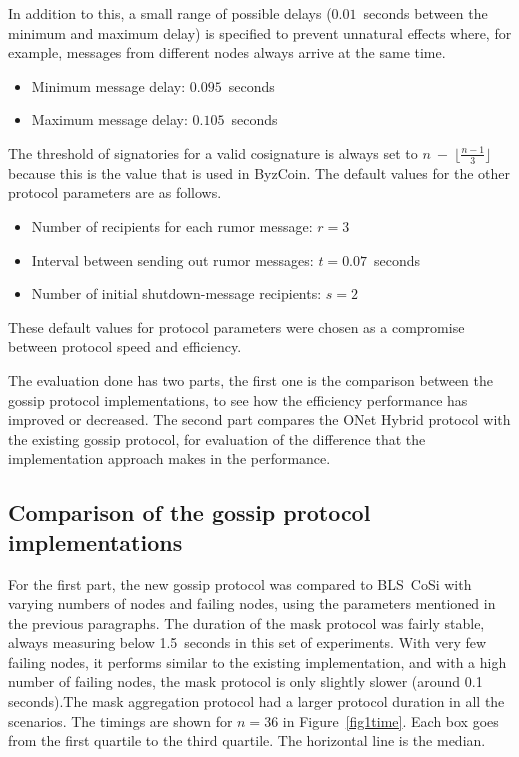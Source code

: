 In addition to this, a small range of possible delays ($0.01$~seconds between the minimum and maximum delay) is specified to prevent unnatural effects where, for example, messages from different nodes always arrive at the same time.

\begin{itemize}
    \item Minimum message delay: $0.095$~seconds
    \item Maximum message delay: $0.105$~seconds
\end{itemize}

The threshold of signatories for a valid cosignature is always set to $n~-~\lfloor \frac{n-1}{3} \rfloor$ because this is the value that is used in ByzCoin.
The default values for the other protocol parameters are as follows.

\begin{itemize}
    \item Number of recipients for each rumor message: $r = 3$
    \item Interval between sending out rumor messages: $t = 0.07$~seconds
    \item Number of initial shutdown-message recipients: $s = 2$
\end{itemize}

These default values for protocol parameters were chosen as a compromise between protocol speed and efficiency.

The evaluation done has two parts, the first one is the comparison between the gossip protocol implementations, to see how the efficiency performance has improved or decreased. The second part compares the ONet Hybrid protocol with the existing gossip protocol, for evaluation of the difference that the implementation approach makes in the performance.

\subsection{Comparison of the gossip protocol implementations}

For the first part, the new gossip protocol was compared to BLS~CoSi with varying numbers of nodes and failing nodes, using the parameters mentioned in the previous paragraphs. The duration of the mask protocol was fairly stable, always measuring below 1.5~seconds in this set of experiments.
With very few failing nodes, it performs similar to the existing implementation, and with a high number of failing nodes, the mask protocol is only slightly slower (around 0.1 seconds).The mask aggregation protocol had a larger protocol duration in all the scenarios.
The timings are shown for $n = 36$ in Figure~\ref{fig1time}. Each box goes from the first quartile to the third quartile. The horizontal line is the median.

